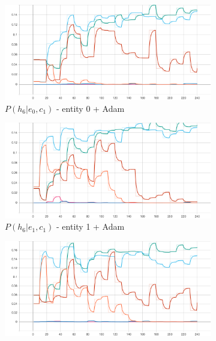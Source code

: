 \begin{figure}[htbp]
    \begin{subfigure}{0.5\textwidth}
        \centering
        \includegraphics[width=\textwidth]{analysis/bhh_case_study/iris/p_HgEC[0][6].png}
        \caption{$P\left(h_{6}|e_{0},c_{1}\right)$ - entity 0 + \Acs{Adam} }
        \label{fig:results:case_study:iris:p_HgEC:0:6}
    \end{subfigure}
    \begin{subfigure}{0.5\textwidth}
        \centering
        \includegraphics[width=\textwidth]{analysis/bhh_case_study/iris/p_HgEC[1][6].png}
        \caption{$P\left(h_{6}|e_{1},c_{1}\right)$ - entity 1 + \Acs{Adam} }
        \label{fig:results:case_study:iris:p_HgEC:1:6}
    \end{subfigure}
    \par\bigskip
    \begin{subfigure}{0.5\textwidth}
        \centering
        \includegraphics[width=\textwidth]{analysis/bhh_case_study/iris/p_HgEC[2][6].png}

\end{subfigure}
\end{figure}
